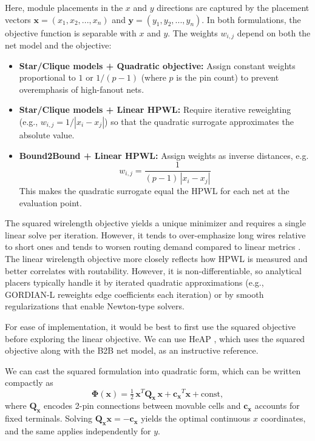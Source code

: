 Here, module placements in the $x$ and $y$ directions are captured by the placement vectors \( \boldsymbol{x} = (x_1, x_2, ..., x_n) \) and \( \boldsymbol{y} = (y_1, y_2, ..., y_n) \).
In both formulations, the objective function is separable with $x$ and $y$.
The weights \(w_{i,j}\) depend on both the net model and the objective:

\begin{itemize}
    \item \textbf{Star/Clique models + Quadratic objective:}  
    Assign constant weights proportional to $1$ or $1/(p-1)$ (where $p$ is the pin count) to prevent overemphasis of high-fanout nets.
    
    \item \textbf{Star/Clique models + Linear HPWL:}  
    Require iterative reweighting (e.g., $w_{i,j}=1/|x_i-x_j|$) so that the quadratic surrogate approximates the absolute value.
    
    \item \textbf{Bound2Bound + Linear HPWL:}  
    Assign weights as inverse distances, e.g.
    \begin{equation}
        w_{i,j} = \frac{1}{(p-1)\,|x_i - x_j|}
        \label{equ:weight_linearized}
    \end{equation}
    This makes the quadratic surrogate equal the HPWL for each net at the evaluation point.
\end{itemize}

The squared wirelength objective yields a unique minimizer and requires a single linear solve per iteration. 
However, it tends to over-emphasize long wires relative to short ones and tends to worsen routing demand compared to linear metrics \cite{AP_2000}. 
The linear wirelength objective more closely reflects how HPWL is measured and better correlates with routability. 
However, it is non-differentiable, so analytical placers typically handle it by iterated quadratic approximations (e.g., GORDIAN-L reweights edge coefficients each iteration) or by smooth regularizations that enable Newton-type solvers. 

For ease of implementation, it would be best to first use the squared objective before exploring the linear objective.
We can use HeAP \cite{AP_2012}, which uses the squared objective along with the B2B net model, as an instructive reference.

We can cast the squared formulation into quadratic form, which can be written compactly as
\begin{equation}
    \boldsymbol{\Phi} (\boldsymbol{x}) 
    = \tfrac{1}{2}\,\boldsymbol{x}^T \boldsymbol{Q_x}\,\boldsymbol{x} + \boldsymbol{c_x}^T \boldsymbol{x} + \text{const},
    \label{equ:quadratic}
\end{equation}
where $\boldsymbol{Q_x}$ encodes 2-pin connections between movable cells and $\boldsymbol{c_x}$ accounts for fixed terminals.  
Solving $\boldsymbol{Q_x}\boldsymbol{x} = -\boldsymbol{c_x}$ yields the optimal continuous $x$ coordinates, and the same applies independently for $y$.



